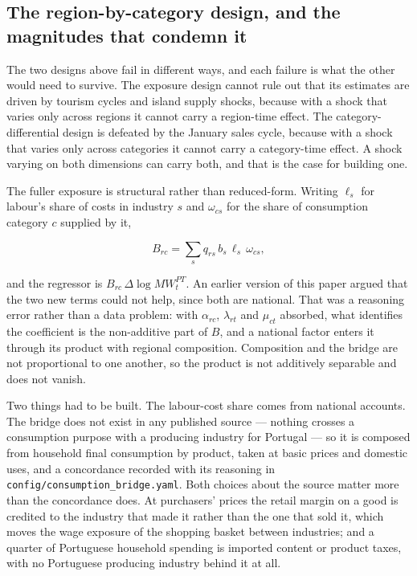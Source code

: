 \subsection{The region-by-category design, and the magnitudes that condemn it}

The two designs above fail in different ways, and each failure is what the other
would need to survive. The exposure design cannot rule out that its estimates
are driven by tourism cycles and island supply shocks, because with a shock that
varies only across regions it cannot carry a region-time effect. The
category-differential design is defeated by the January sales cycle, because
with a shock that varies only across categories it cannot carry a category-time
effect. A shock varying on both dimensions can carry both, and that is the case
for building one.

The fuller exposure is structural rather than reduced-form. Writing $\ell_s$ for
labour's share of costs in industry $s$ and $\omega_{cs}$ for the share of
consumption category $c$ supplied by it,

\begin{equation}
  B_{rc} = \sum_{s} q_{rs}\, b_{s}\, \ell_{s}\, \omega_{cs},
  \label{eq:structural-exposure}
\end{equation}

and the regressor is $B_{rc}\,\Delta \log MW^{PT}_t$. An earlier version of this
paper argued that the two new terms could not help, since both are national. That
was a reasoning error rather than a data problem: with $\alpha_{rc}$,
$\lambda_{rt}$ and $\mu_{ct}$ absorbed, what identifies the coefficient is the
non-additive part of $B$, and a national factor enters it through its product
with regional composition. Composition and the bridge are not proportional to one
another, so the product is not additively separable and does not vanish.

Two things had to be built. The labour-cost share comes from national accounts.
The bridge does not exist in any published source --- nothing crosses a
consumption purpose with a producing industry for Portugal --- so it is composed
from household final consumption by product, taken at basic prices and domestic
uses, and a concordance recorded with its reasoning in
\texttt{config/consumption\_bridge.yaml}. Both choices about the source matter
more than the concordance does. At purchasers' prices the retail margin on a
good is credited to the industry that made it rather than the one that sold it,
which moves the wage exposure of the shopping basket between industries; and a
quarter of Portuguese household spending is imported content or product taxes,
with no Portuguese producing industry behind it at all.

